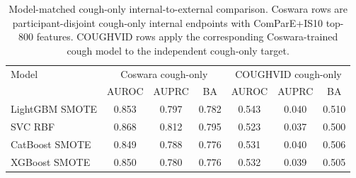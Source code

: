 \documentclass[preprint,12pt]{elsarticle}
\begin{document}
\begin{table}[t]
\centering
\caption{COUGHVID external-transfer results for Coswara-trained cough-only ComParE2016+IS10 models. Low AUPRC and low sensitivity at the validation-selected threshold indicate that these cough models do not operate as useful external screening rules on COUGHVID.}
\label{tab:external-transfer}
\scriptsize
\setlength{\tabcolsep}{2.5pt}
\end{table}

\begin{table}[t]
\centering
\caption{Model-matched cough-only internal-to-external comparison. Coswara rows are participant-disjoint cough-only internal endpoints with ComParE+IS10 top-800 features. COUGHVID rows apply the corresponding Coswara-trained cough model to the independent cough-only target.}
\label{tab:cough-matched-transfer}
\small
\begin{tabular}{lcccccc}
\toprule
Model & \multicolumn{3}{c}{Coswara cough-only} & \multicolumn{3}{c}{COUGHVID cough-only} \\
\cmidrule(lr){2-4}\cmidrule(lr){5-7}
 & AUROC & AUPRC & BA & AUROC & AUPRC & BA \\
\midrule
LightGBM SMOTE & 0.853 & 0.797 & 0.782 & 0.543 & 0.040 & 0.510 \\
SVC RBF & 0.868 & 0.812 & 0.795 & 0.523 & 0.037 & 0.500 \\
CatBoost SMOTE & 0.849 & 0.788 & 0.776 & 0.531 & 0.040 & 0.506 \\
XGBoost SMOTE & 0.850 & 0.780 & 0.776 & 0.532 & 0.039 & 0.505 \\
\bottomrule
\end{tabular}
\end{table}
\end{document}
